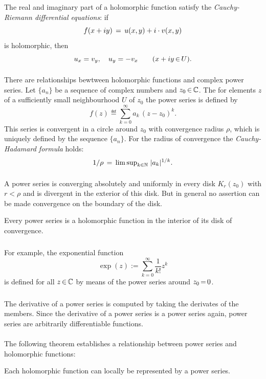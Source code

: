 \documentclass[11pt,twoside]{article}
\begin{document}
\subparagraph{}
The real and imaginary part of a holomorphic function satisfy
the \textit{Cauchy-Riemann differential equations}:
if
\[
f(x+iy) \= u(x,y) + i \cdot v(x,y)
\]
is holomorphic, then
\[
u_x = v_y, \quad u_y = - v_x \qquad (x+iy \xeof U).
\]

\paragraph{}
There are relationships bewtween holomorphic functions
and complex power series.
Let $\{a_n\}$ be a sequence of complex numbers and $z_0 \xeof \C$.
The for elements $z$ of a sufficiently small neighbourhood $U$
of $z_0$ the power series is defined by
\[
f(z) \eqdef \sum_{k=0}^{\infty} a_k \, (z-z_0)^k.
\]
This series is convergent in a circle around $z_0$
with convergence radius $\rho$,
which is uniquely defined by the sequence $\{a_n\}$.
For the radius of convergence the \textit{Cauchy-Hadamard formula} holds:
\[
1 / \rho \= {\lim \sup}_{k \in \N} \; \abs{a_k} ^{1/k}.
\]

\paragraph{}
A power series is converging absolutely and uniformly in every disk
$K_r(z_0)$ with $r < \rho$ and is divergent in the exterior of this disk.
But in general no assertion can be made {\wrt} convergence on the boundary of the disk.

\begin{theorem}
Every power series is a holomorphic function in the interior of its disk of convergence.
\end{theorem}

\subparagraph{}
For example,
the exponential function
\[
\exp(z) := \sum_{k=0}^{\infty} \frac{1}{k!} z^k
\]
is defined for all $z \xeof \C$ by means of the power series around $z_0 \eq 0$.

\subparagraph{}
The derivative of a power series is computed by taking the derivates of the members.
Since the derivative of a power series is a  power series again,
power series are arbitrarily differentiable functions.

\paragraph{}
The following theorem establishes a relationship
between power series and holomorphic functions:

\begin{theorem}
Each holomorphic function can locally be represented by a power series.
\end{theorem}
\end{document}
